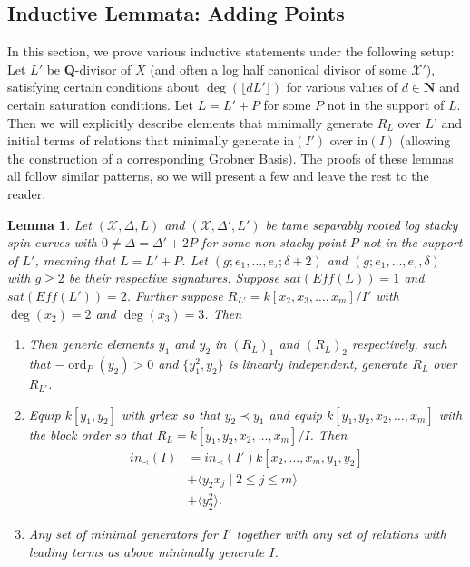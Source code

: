 \documentclass{amsart}
\theoremstyle{plain}
\newtheorem{lem}[thm]{Lemma}
\theoremstyle{definition}
\theoremstyle{remark}
\numberwithin{equation}{section}
\newcommand\ssec{\subsection}
\newcommand \sx{\mathscr X}
\DeclareMathOperator{\ord}{ord}
\newcommand \halfcan{L}
\newcommand \initial{\text{in}}
\begin{document}
\ssec{Inductive Lemmata: Adding Points}
\label{ssec:add_pts}
In this section, we prove various inductive statements under the following setup:
Let $\halfcan'$ be $\mathbf{Q}$-divisor of $X$ (and often a log half canonical divisor of some $\sx'$), satisfying certain conditions about $\deg(\lfloor d \halfcan'\rfloor)$ for various values of $d\in\mathbf{N}$ and certain saturation conditions.  Let $\halfcan=\halfcan'+P$ for some $P$ not in the support of $\halfcan$.  Then we will explicitly describe elements that minimally generate $R_\halfcan$ over $\halfcan$' and initial terms of relations that minimally generate $\initial(I')$ over $\initial(I)$ (allowing the construction of a corresponding Grobner Basis).   The proofs of these lemmas all follow similar patterns, so we will present a few  and leave the rest to the reader.

\begin{lem}\label{lem:adding_points_saturation_2_to_1_with_log}
Let $(\sx, \Delta, \halfcan)$ and $(\sx, \Delta', L')$ be tame separably rooted log stacky spin 
curves with $0\ne \Delta=\Delta'+2P$ for some non-stacky point $P$ not in the support of $
\halfcan'$, meaning that $L=L'+P$.  Let $(g; e_1, \ldots, e_\tau; \delta+2)$ and $(g; e_1, 
\ldots, e_\tau, \delta)$ with $g\ge 2$ be their respective signatures.  Suppose 
$sat(Eff(\halfcan))=1$ and $sat(Eff(\halfcan'))=2$.  Further suppose $R_{\halfcan'} = k[x_2, 
x_3, \ldots, x_m]/I'$ with $\deg(x_2) = 2$ and $\deg(x_3) = 3$.  Then
\begin{enumerate}
\item[(a)] Then generic elements $y_1$ and $y_2$ in $(R_{\halfcan})_1$ and $
(R_{\halfcan})_2$ respectively, such that $-\ord_P(y_2)>0$ and $\{y_1^2, y_2\}$ is linearly 
independent, generate $R_\halfcan$ over $R_{\halfcan'}$.
\item[(b)] Equip $k[y_1,y_2]$ with $grlex$ so that $y_2 \prec y_1$ and equip $k[y_1, y_2, 
x_2, \ldots, x_m]$ with the block order so that $R_\halfcan=k[y_1, y_2, x_2, \ldots, x_m]/I$.  
Then
\begin{align*}
			in_\prec(I) &= in_\prec(I')k[x_2, \ldots, x_m, y_1, y_2] \\
			&+\langle y_2 x_j \mid 2 \leq j \leq m \rangle \\
			&+\langle y_2^2\rangle.
		\end{align*}
\item[(c)] Any set of minimal generators for $I'$ together with any set of relations with 
leading terms as above minimally generate $I$.
\end{enumerate}
\end{lem}
\end{document}
